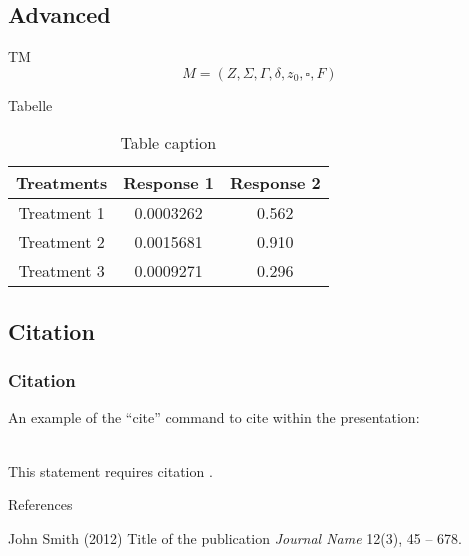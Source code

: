 \subsection{Advanced}

\begin{frame}{TM}
	$$M = (Z,\Sigma,\Gamma,\delta,z_0,\square,F)$$
\end{frame}

\begin{frame}{Tabelle}
	\centering
	\begin{table}
		\begin{tabular}{c c c}
			\toprule
			\textbf{Treatments} & \textbf{Response 1} & \textbf{Response 2} \\
			\midrule
			Treatment 1         & 0.0003262           & 0.562               \\
			Treatment 2         & 0.0015681           & 0.910               \\
			Treatment 3         & 0.0009271           & 0.296               \\
			\bottomrule
		\end{tabular}
		\caption{Table caption}
	\end{table}
\end{frame}

\subsection{Citation}

\begin{frame}[Citation]
    \frametitle{Citation}
    An example of the \enquote{cite} command to cite within the presentation:\\~

    This statement requires citation \cite{p1}.
\end{frame}

\begin{frame}{References}
    \footnotesize{
        \begin{thebibliography}{99}
             John Smith (2012)
            \newblock Title of the publication
            \newblock \emph{Journal Name} 12(3), 45 -- 678.
        \end{thebibliography}
    }
\end{frame}